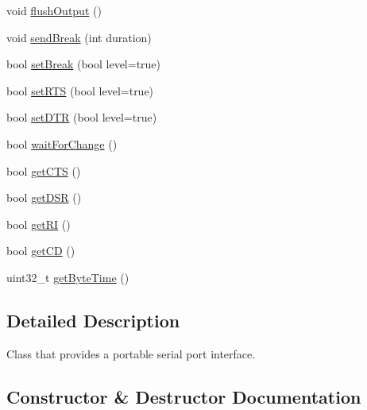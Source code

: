 \begin{DoxyCompactItemize}
void \hyperlink{classserial_1_1_serial_a95e0d6dcf2b7b9aa45225bfb1647c427}{flush\+Output} ()
\item 
void \hyperlink{classserial_1_1_serial_ab35e474beb136258cbeb04978be27455}{send\+Break} (int duration)
\item 
bool \hyperlink{classserial_1_1_serial_abb7eef9db06c582e2e504733b4150968}{set\+Break} (bool level=true)
\item 
bool \hyperlink{classserial_1_1_serial_a7c91f22768107389f52d80d691994fc7}{set\+R\+TS} (bool level=true)
\item 
bool \hyperlink{classserial_1_1_serial_a4c8a44a1e6ce42f8cb521d9a4e10bc59}{set\+D\+TR} (bool level=true)
\item 
bool \hyperlink{classserial_1_1_serial_a9d889dc0ec2cec50a620650f10cf8e83}{wait\+For\+Change} ()
\item 
bool \hyperlink{classserial_1_1_serial_a97603438c9ded81a886f914b7a335d7f}{get\+C\+TS} ()
\item 
bool \hyperlink{classserial_1_1_serial_a91a00816bce6a163ea022b4cf8d4ce0e}{get\+D\+SR} ()
\item 
bool \hyperlink{classserial_1_1_serial_a29a1f68b9a238e9a6a833373855708ce}{get\+RI} ()
\item 
bool \hyperlink{classserial_1_1_serial_a5a7c1a8e363b530147970155d0f6fe8d}{get\+CD} ()
\item 
uint32\+\_\+t \hyperlink{classserial_1_1_serial_a8b7ad05b2521db6bbf184108f59e105e}{get\+Byte\+Time} ()
\end{DoxyCompactItemize}


\subsection{Detailed Description}
Class that provides a portable serial port interface. 

\subsection{Constructor \& Destructor Documentation}
